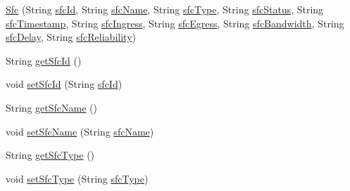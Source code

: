 \begin{DoxyCompactItemize}
\mbox{\hyperlink{classcom_1_1example_1_1demo_1_1modular_1_1_sfc_ac1ef8ca26375568b69e4ef90a4cb75f5}{Sfc}} (String \mbox{\hyperlink{classcom_1_1example_1_1demo_1_1modular_1_1_sfc_aba8e4759cfedf074527ff6d7c6dba30f}{sfc\+Id}}, String \mbox{\hyperlink{classcom_1_1example_1_1demo_1_1modular_1_1_sfc_a85b084e096b77104d6aa0e95cd4bd0f1}{sfc\+Name}}, String \mbox{\hyperlink{classcom_1_1example_1_1demo_1_1modular_1_1_sfc_a5c4b85dd7191b225e0de4a9b54d09400}{sfc\+Type}}, String \mbox{\hyperlink{classcom_1_1example_1_1demo_1_1modular_1_1_sfc_aef4582f35cc35919c5384cdee5c20c32}{sfc\+Status}}, String \mbox{\hyperlink{classcom_1_1example_1_1demo_1_1modular_1_1_sfc_ad08b3121bf8fb27334db93307b052824}{sfc\+Timestamp}}, String \mbox{\hyperlink{classcom_1_1example_1_1demo_1_1modular_1_1_sfc_a56183d5e87ad5eefd0a6bc3a80244c86}{sfc\+Ingress}}, String \mbox{\hyperlink{classcom_1_1example_1_1demo_1_1modular_1_1_sfc_a399543ab700135a2ab190a508d898ea1}{sfc\+Egress}}, String \mbox{\hyperlink{classcom_1_1example_1_1demo_1_1modular_1_1_sfc_a57d1d7ebc46372af945f9ddbea5cc063}{sfc\+Bandwidth}}, String \mbox{\hyperlink{classcom_1_1example_1_1demo_1_1modular_1_1_sfc_a7bfb3b587900390e0e9459a419fafabe}{sfc\+Delay}}, String \mbox{\hyperlink{classcom_1_1example_1_1demo_1_1modular_1_1_sfc_a7979940d0a89b6111782fbfe339c84a0}{sfc\+Reliability}})
\item 
String \mbox{\hyperlink{classcom_1_1example_1_1demo_1_1modular_1_1_sfc_aaa01e2a52e8f18d28ea56ca0a7c48f32}{get\+Sfc\+Id}} ()
\item 
void \mbox{\hyperlink{classcom_1_1example_1_1demo_1_1modular_1_1_sfc_a8e8070521a38acf41cb0876ea85cb920}{set\+Sfc\+Id}} (String \mbox{\hyperlink{classcom_1_1example_1_1demo_1_1modular_1_1_sfc_aba8e4759cfedf074527ff6d7c6dba30f}{sfc\+Id}})
\item 
String \mbox{\hyperlink{classcom_1_1example_1_1demo_1_1modular_1_1_sfc_a1b56551b2483278c5eaa1b0361a091e4}{get\+Sfc\+Name}} ()
\item 
void \mbox{\hyperlink{classcom_1_1example_1_1demo_1_1modular_1_1_sfc_a453950de18d5026e7a349d1ad76daa99}{set\+Sfc\+Name}} (String \mbox{\hyperlink{classcom_1_1example_1_1demo_1_1modular_1_1_sfc_a85b084e096b77104d6aa0e95cd4bd0f1}{sfc\+Name}})
\item 
String \mbox{\hyperlink{classcom_1_1example_1_1demo_1_1modular_1_1_sfc_a443e5e921610906af4da92597c94fbee}{get\+Sfc\+Type}} ()
\item 
void \mbox{\hyperlink{classcom_1_1example_1_1demo_1_1modular_1_1_sfc_a62cbff2044c0a4d6c1079b4ee0c08f15}{set\+Sfc\+Type}} (String \mbox{\hyperlink{classcom_1_1example_1_1demo_1_1modular_1_1_sfc_a5c4b85dd7191b225e0de4a9b54d09400}{sfc\+Type}})

\end{DoxyCompactItemize}
